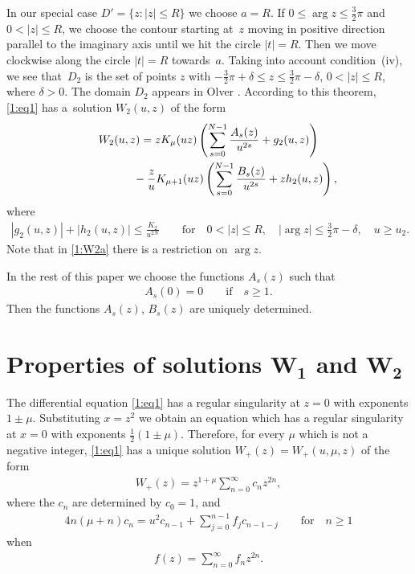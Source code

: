 \documentclass[11pt]{article}
\numberwithin{equation}{section}
\begin{document}
In our special case $D'=\{z\colon |z|\le R\}$ we choose $a=R$. If $0\le\arg z\le \frac32\pi$ and $0<|z|\le R$, we choose the contour starting at~$z$
moving in positive direction parallel to the imaginary axis until we hit the circle $|t|=R$. Then we move clockwise along the circle $|t|=R$ towards~$a$. Taking into account condition~(iv), we see that~$D_2$ is the set of points $z$ with $-\frac32\pi+\delta\le z\le \frac32\pi-\delta$,
$0<|z|\le R$, where $\delta>0$.
The domain $D_2$ appears in Olver \cite[Theorem~D(ii)]{O}. According to this theorem, \eqref{1:eq1} has a~solution $W_2(u,z)$ of the form
\begin{gather}
W_2(u,z)=zK_\mu(uz)\left(\sum_{s=0}^{N-1} \frac{A_s(z)}{u^{2s}}+g_2(u,z)\right)\nonumber\\
\hphantom{W_2(u,z)=}{} -\frac{z}{u}K_{\mu+1}(uz)\left(\sum_{s=0}^{N-1} \frac{B_s(z)}{u^{2s}}+zh_2(u,z)\right),\label{1:W2}
\end{gather}
where
\begin{gather}\label{1:W2a}
 |g_2(u,z)|+|h_2(u,z)|\le \frac{K_2}{u^{2N}}\qquad \text{for} \quad 0<|z|\le R, \quad |\arg z|\le \frac32\pi-\delta, \quad u\ge u_2 .
\end{gather}
Note that in \eqref{1:W2a} there is a restriction on $\arg z$.

In the rest of this paper we choose the functions $A_s(z)$ such that
\begin{gather}\label{1:As}
A_s(0)=0\qquad\text{if} \quad s\ge 1.
\end{gather}
Then the functions $A_s(z)$, $B_s(z)$ are uniquely determined.

\section[Properties of solutions $W_1$ and $W_2$]{Properties of solutions $\boldsymbol{W_1}$ and $\boldsymbol{W_2}$}\label{discussion}

The dif\/ferential equation \eqref{1:eq1} has a regular singularity at $z=0$ with exponents $1\pm \mu$.
Substituting $x=z^2$ we obtain an equation which has a regular singularity at $x=0$ with exponents $\frac12(1\pm\mu)$.
Therefore, for every $\mu$ which is not a negative integer, \eqref{1:eq1} has a unique solution $W_+(z)=W_+(u,\mu,z)$ of the form
\begin{gather*}%
W_+(z)= z^{1+\mu}\sum_{n=0}^\infty c_nz^{2n},
\end{gather*}
where the $c_n$ are determined by $c_0=1$, and
\begin{gather*}
4n(\mu+n)c_n=u^2c_{n-1}+\sum_{j=0}^{n-1}f_jc_{n-1-j} \qquad\text{for} \quad n\ge 1
\end{gather*}
when
\begin{gather*}
f(z)=\sum_{n=0}^\infty f_n z^{2n} .
\end{gather*}
\end{document}
